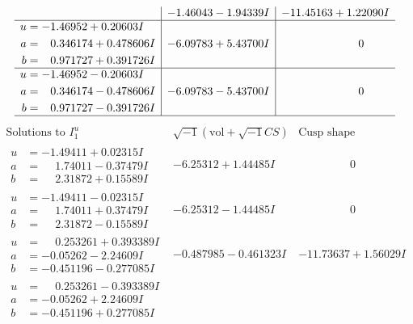\documentclass[1p]{elsarticle_modified}
\theoremstyle{definition}
\newcommand{\I}{\sqrt{-1}}
\begin{document}
$$\begin{array}{c|c|c}
 & -1.46043 - 1.94339 I & -11.45163 + 1.22090 I \\ \hline\begin{aligned}
u &= -1.46952 + 0.20603 I \\
a &= \phantom{-}0.346174 + 0.478606 I \\
b &= \phantom{-}0.971727 + 0.391726 I\end{aligned}
 & -6.09783 + 5.43700 I & \phantom{-0.000000 } 0 \\ \hline\begin{aligned}
u &= -1.46952 - 0.20603 I \\
a &= \phantom{-}0.346174 - 0.478606 I \\
b &= \phantom{-}0.971727 - 0.391726 I\end{aligned}
 & -6.09783 - 5.43700 I & \phantom{-0.000000 } 0\\
 \hline 
 \end{array}$$\newpage$$\begin{array}{c|c|c}  
\text{Solutions to }I^u_{1}& \I (\text{vol} + \sqrt{-1}CS) & \text{Cusp shape}\\
 \hline 
\begin{aligned}
u &= -1.49411 + 0.02315 I \\
a &= \phantom{-}1.74011 - 0.37479 I \\
b &= \phantom{-}2.31872 + 0.15589 I\end{aligned}
 & -6.25312 + 1.44485 I & \phantom{-0.000000 } 0 \\ \hline\begin{aligned}
u &= -1.49411 - 0.02315 I \\
a &= \phantom{-}1.74011 + 0.37479 I \\
b &= \phantom{-}2.31872 - 0.15589 I\end{aligned}
 & -6.25312 - 1.44485 I & \phantom{-0.000000 } 0 \\ \hline\begin{aligned}
u &= \phantom{-}0.253261 + 0.393389 I \\
a &= -0.05262 - 2.24609 I \\
b &= -0.451196 - 0.277085 I\end{aligned}
 & -0.487985 - 0.461323 I & -11.73637 + 1.56029 I \\ \hline\begin{aligned}
u &= \phantom{-}0.253261 - 0.393389 I \\
a &= -0.05262 + 2.24609 I \\
b &= -0.451196 + 0.277085 I\end{aligned}

\end{array}$$
\end{document}
